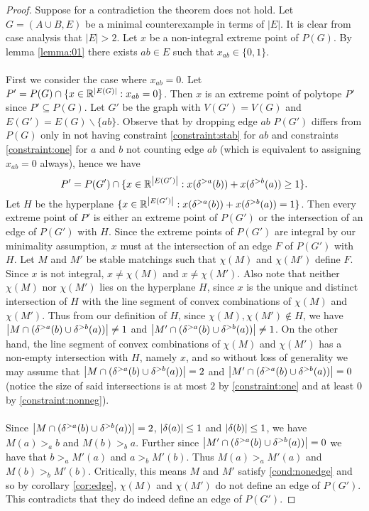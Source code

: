 \begin{proof}
Suppose for a contradiction the theorem does not hold. Let $G=(A\cup B, E)$ be a minimal counterexample in terms of $|E|$. It is clear from case analysis that $|E| > 2$. Let $x$ be a non-integral extreme point of $P(G)$. By lemma \ref{lemma:01} there exists $ab \in E$ such that $x_{ab} \in \{0,1\}$.
\paragraph{}
First we consider the case where $x_{ab} = 0$. Let $P' = P(G) \cap \{x \in \mathbb{R}^{\left|E(G)\right|} : x_{ab} = 0 \}$. Then $x$ is an extreme point of polytope $P'$ since $P' \subseteq P(G)$. Let $G'$ be the graph with $V(G') = V(G)$ and $E(G') = E(G) \backslash \{ab\}$. Observe that by dropping edge $ab$ $P(G')$ differs from $P(G)$ only in not having constraint \ref{constraint:stab} for $ab$ and constraints \ref{constraint:one} for $a$ and $b$ not counting edge $ab$ (which is equivalent to assigning $x_{ab} = 0$ always), hence we have
$$P' = P(G') \cap \{x \in \mathbb{R}^{\left|E(G')\right|} : x(\delta^{>a}(b)) + x(\delta^{>b}(a)) \geq 1 \}.$$
Let $H$ be the hyperplane $\{x \in \mathbb{R}^{\left|E(G')\right|} : x(\delta^{>a}(b)) + x(\delta^{>b}(a)) = 1\}$. Then every extreme point of $P'$ is either an extreme point of $P(G')$ or the intersection of an edge of $P(G')$ with $H$. Since the extreme points of $P(G')$ are integral by our minimality assumption, $x$ must at the intersection of an edge $F$ of $P(G')$ with $H$. Let $M$ and $M'$ be stable matchings such that $\chi(M)$ and $\chi(M')$ define $F$. Since $x$ is not integral, $x \neq \chi(M)$ and $x \neq \chi(M')$. Also note that neither $\chi(M)$ nor $\chi(M')$ lies on the hyperplane $H$, since $x$ is the unique and distinct intersection of $H$ with the line segment of convex combinations of $\chi(M)$ and $\chi(M')$. Thus from our definition of $H$, since $\chi(M), \chi(M') \not\in H$,  we have $\left|M \cap (\delta^{>a}(b) \cup \delta^{>b}(a))\right| \neq 1$ and $\left|M' \cap (\delta^{>a}(b) \cup \delta^{>b}(a))\right| \neq 1$. On the other hand, the line segment of convex combinations of $\chi(M)$ and $\chi(M')$ has a non-empty intersection with $H$, namely $x$,  and so without loss of generality we may assume that $\left|M \cap (\delta^{>a}(b) \cup \delta^{>b}(a))\right| = 2$ and $\left|M' \cap (\delta^{>a}(b) \cup \delta^{>b}(a))\right| = 0$ (notice the size of said intersections is at most $2$ by \ref{constraint:one} and at least $0$ by \ref{constraint:nonneg}).
\paragraph{}
Since $\left|M \cap (\delta^{>a}(b) \cup \delta^{>b}(a))\right| = 2$, $\left|\delta(a)\right| \leq 1$ and $\left|\delta(b)\right| \leq 1$, we have $M(a) >_a b$ and $M(b) >_b a$. Further since $\left|M' \cap (\delta^{>a}(b) \cup \delta^{>b}(a))\right| = 0$ we have that $b >_a M'(a)$ and $a >_b M'(b)$. Thus $M(a) >_a M'(a)$ and $M(b) >_b M'(b)$. Critically, this means $M$ and $M'$ satisfy \ref{cond:nonedge} and so by corollary \ref{cor:edge}, $\chi(M)$ and $\chi(M')$ do not define an edge of $P(G')$. This contradicts that they do indeed define an edge of $P(G')$.

\end{proof}
